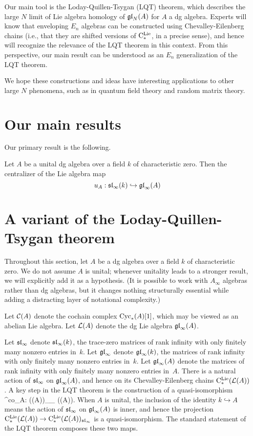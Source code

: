\documentclass[11pt]{amsart}
\numberwithin{equation}{section}
\begin{document}
Our main tool is the Loday-Quillen-Tsygan (LQT) theorem,
which describes the large $N$ limit of Lie algebra homology of $\gl_N(A)$ for $A$ a dg algebra.
Experts will know that enveloping $E_n$ algebras can be constructed using Chevalley-Eilenberg chains
(i.e., that they are shifted versions of $\cliels$, in a precise sense),
and hence will recognize the relevance of the LQT theorem in this context.
From this perspective, our main result can be understood as an $E_n$ generalization of the LQT theorem.

We hope these constructions and ideas have interesting applications to other large $N$ phenomena,
such as in quantum field theory and random matrix theory.

\section{Our main results}

Our primary result is the following.

\begin{thm}
Let $A$ be a unital dg algebra over a field $k$ of characteristic zero. 
Then the centralizer of the Lie algebra map 
\[
u_A: \sl_\infty(k) \hookrightarrow \gl_\infty(A)
\]
\end{thm}

\section{A variant of the Loday-Quillen-Tsygan theorem}

Throughout this section, let $A$ be a dg algebra over a field $k$ of characteristic zero.
We do not assume $A$ is unital; whenever unitality leads to a stronger result, we will explicitly add it as a hypothesis.
(It is possible to work with $A_\infty$ algebras rather than dg algebras, 
but it changes nothing structurally essential while adding a distracting layer of notational complexity.)

\begin{dfn}
Let $\cC(A)$ denote the cochain complex $\Cyc_*(A)[1]$, which may be viewed as an abelian Lie algebra. 
Let $\cL(A)$ denote the dg Lie algebra $\gl_\infty(A)$.
\end{dfn}

Let $\sl_\infty$ denote $\sl_\infty(k)$, the trace-zero matrices of rank infinity with only finitely many nonzero entries in~$k$.
Let $\gl_\infty$ denote $\gl_\infty(k)$, the matrices of rank infinity with only finitely many nonzero entries in~$k$.
Let $\gl_\infty(A)$ denote the matrices of rank infinity with only finitely many nonzero entries in~$A$.
There is a natural action of $\sl_\infty$ on $\gl_\infty(A)$, 
and hence on its Chevalley-Eilenberg chains $\cliels(\cL(A))$.
A key step in the LQT theorem is the construction of a quasi-isomorphism
\beqn\label{lqtco}
\lambda^{co}_A: \cliels(\cL(A))_{\sl_\infty} \xto{\cong} \Sym(\cC(A)).
\eeqn
When $A$ is unital, the inclusion of the identity $k \hookrightarrow A$ means the action of $\sl_\infty$ on $\gl_\infty(A)$ is inner, 
and hence the projection $\cliels(\cL(A)) \to \cliels(\cL(A))_{\sl_\infty}$ is a quasi-isomorphism.
The standard statement of the LQT theorem composes these two maps.
\end{document}
